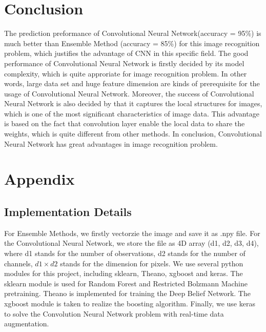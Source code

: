 \documentclass[11pt,oneside,a4paper]{article}
\numberwithin{equation}{section}
\begin{document}
\section{Conclusion}
The prediction preformance of Convolutional Neural Network(accuracy = 95\%) is much better than Ensemble Method (accuracy = 85\%) for this image recognition problem, which justifies the advantage of CNN in this specific field. The good performance of Convolutional Neural Network is firstly decided by its model complexity, which is quite approriate for image recognition problem. In other words, large data set and huge feature dimension are kinds of prerequisite for the usage of Convolutional Neural Network. Moreover, the success of Convolutional Neural Network is also decided by that it captures the local structures for images, which is one of the most significant characteristics of image data. This advantage is based on the fact that convolution layer enable the local data to share the weights, which is quite different from other methods. In conclusion, Convolutional Neural Network has great advantages in image recognition problem.

\printbibliography

\clearpage
\section*{Appendix}
\subsection*{Implementation Details}
For Ensemble Methods, we firstly vectorzie the image and save it as .npy file. For the Convolutional Neural Network, we store the file as 4D array (d1, d2, d3, d4), where d1 stands for the number of observations, d2 stands for the number of channels, $d1 \times d2$ stands for the dimension for pixels.
We use several python modules for this project, including sklearn, Theano, xgboost and keras. The sklearn module is used for Random Forest and Restricted Bolzmann Machine pretraining. Theano is implemented for training the Deep Belief Network. The xgboost module is taken to realize the boosting algorithm. Finally, we use keras to solve the Convolution Neural Network problem with real-time data augmentation.
\end{document}
